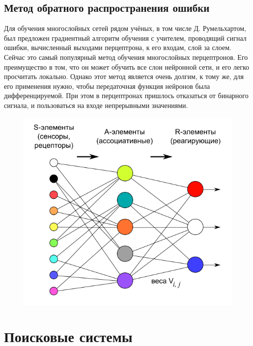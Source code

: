 \subsection{Метод обратного распространения ошибки}

Для обучения многослойных сетей рядом учёных, в том числе Д. Румельхартом, был предложен градиентный алгоритм обучения с учителем, проводящий сигнал ошибки, вычисленный выходами перцептрона, к его входам, слой за слоем. Сейчас это самый популярный метод обучения многослойных перцептронов. Его преимущество в том, что он может обучить все слои нейронной сети, и его легко просчитать локально. Однако этот метод является очень долгим, к тому же, для его применения нужно, чтобы передаточная функция нейронов была дифференцируемой. При этом в перцептронах пришлось отказаться от бинарного сигнала, и пользоваться на входе непрерывными значениями.

\begin{figure}[h]
	\centering
	\includegraphics[height=4in]{images/intro_perceptron.png}
\end{figure}

\section{Поисковые системы}

